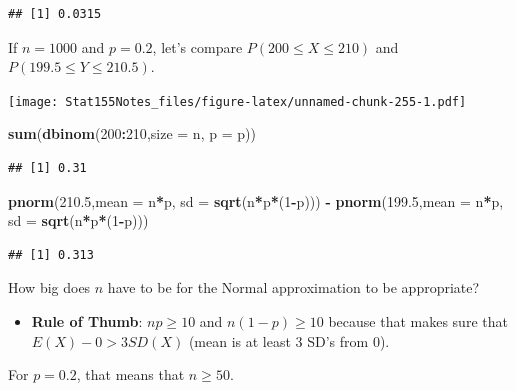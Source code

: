 \documentclass[]{book}
\newenvironment{Shaded}{\begin{snugshade}}{\end{snugshade}}
\newcommand{\DataTypeTok}[1]{\textcolor[rgb]{0.13,0.29,0.53}{#1}}
\newcommand{\DecValTok}[1]{\textcolor[rgb]{0.00,0.00,0.81}{#1}}
\newcommand{\FloatTok}[1]{\textcolor[rgb]{0.00,0.00,0.81}{#1}}
\newcommand{\KeywordTok}[1]{\textcolor[rgb]{0.13,0.29,0.53}{\textbf{#1}}}
\newcommand{\NormalTok}[1]{#1}
\newcommand{\OperatorTok}[1]{\textcolor[rgb]{0.81,0.36,0.00}{\textbf{#1}}}
\newcommand{\StringTok}[1]{\textcolor[rgb]{0.31,0.60,0.02}{#1}}
\providecommand{\tightlist}{%
  \setlength{\itemsep}{0pt}\setlength{\parskip}{0pt}}
\begin{document}
\begin{verbatim}
## [1] 0.0315
\end{verbatim}

If \(n=1000\) and \(p=0.2\), let's compare \(P(200\leq X\leq 210)\) and \(P(199.5\leq Y\leq 210.5)\).

\texttt{[image: Stat155Notes\_files/figure-latex/unnamed-chunk-255-1.pdf]}

\begin{Shaded}
\begin{Highlighting}[]
\KeywordTok{sum}\NormalTok{(}\KeywordTok{dbinom}\NormalTok{(}\DecValTok{200}\OperatorTok{:}\DecValTok{210}\NormalTok{,}\DataTypeTok{size =}\NormalTok{ n, }\DataTypeTok{p =}\NormalTok{ p))}
\end{Highlighting}
\end{Shaded}

\begin{verbatim}
## [1] 0.31
\end{verbatim}

\begin{Shaded}
\begin{Highlighting}[]
\KeywordTok{pnorm}\NormalTok{(}\FloatTok{210.5}\NormalTok{,}\DataTypeTok{mean =}\NormalTok{ n}\OperatorTok{*}\NormalTok{p, }\DataTypeTok{sd =} \KeywordTok{sqrt}\NormalTok{(n}\OperatorTok{*}\NormalTok{p}\OperatorTok{*}\NormalTok{(}\DecValTok{1}\OperatorTok{-}\NormalTok{p))) }\OperatorTok{-}\StringTok{ }\KeywordTok{pnorm}\NormalTok{(}\FloatTok{199.5}\NormalTok{,}\DataTypeTok{mean =}\NormalTok{ n}\OperatorTok{*}\NormalTok{p, }\DataTypeTok{sd =} \KeywordTok{sqrt}\NormalTok{(n}\OperatorTok{*}\NormalTok{p}\OperatorTok{*}\NormalTok{(}\DecValTok{1}\OperatorTok{-}\NormalTok{p)))}
\end{Highlighting}
\end{Shaded}

\begin{verbatim}
## [1] 0.313
\end{verbatim}

How big does \(n\) have to be for the Normal approximation to be appropriate?

\begin{itemize}
\tightlist
\item
  \textbf{Rule of Thumb}: \(np \geq 10\) and \(n(1-p)\geq 10\) because that makes sure that \(E(X)-0>3SD(X)\) (mean is at least 3 SD's from 0).
\end{itemize}

For \(p=0.2\), that means that \(n\geq 50\).
\end{document}

